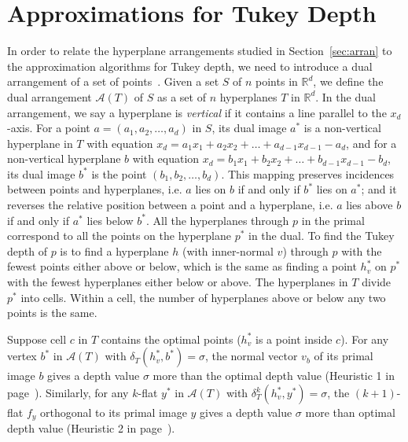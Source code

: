 \documentclass{patmorin}
\begin{document}
\section{Approximations for Tukey Depth}
\label{sec:approx}

In order to relate the hyperplane arrangements studied in Section~\ref{sec:arran} to the approximation algorithms for Tukey depth, we need to introduce a dual arrangement of a set of points~\cite{Edel87}. Given a set $S$ of $n$ points in $\mathbb{R}^{d}$, we define the dual arrangement $\mathcal{A}(T)$ of $S$ as a set of $n$ hyperplanes $T$ in $\mathbb{R}^{d}$. In the dual arrangement, we say a hyperplane is \emph{vertical} if it contains a line parallel to the $x_{d}$-axis. For a point $a = (a_{1}, a_{2}, \ldots, a_{d})$ in $S$, its dual image $a^{*}$ is a non-vertical hyperplane in $T$ with equation $x_{d} = a_{1}x_{1} + a_{2}x_{2} + \ldots + a_{d-1}x_{d-1} - a_{d}$, and for a non-vertical hyperplane $b$ with equation $x_{d} = b_{1}x_{1} + b_{2}x_{2} + \ldots + b_{d-1}x_{d-1} - b_{d}$, its dual image $b^{*}$ is the point $(b_{1}, b_{2}, \ldots, b_{d})$. This mapping preserves incidences between points and hyperplanes, i.e. $a$ lies on $b$ if and only if $b^{*}$ lies on $a^{*}$; and it reverses the relative position between a point and a hyperplane, i.e. $a$ lies above $b$ if and only if $a^{*}$ lies below $b^{*}$. All the hyperplanes through $p$ in the primal correspond to all the points on the hyperplane $p^{*}$ in the dual. To find the Tukey depth of $p$ is to find a hyperplane $h$ (with inner-normal $v$) through $p$ with the fewest points either above or below, which is the same as finding a point $h_{v}^{*}$ on $p^{*}$ with the fewest hyperplanes either below or above. The hyperplanes in $T$ divide $p^{*}$ into cells. Within a cell, the number of hyperplanes above or below any two points is the same.

Suppose cell $c$ in $T$ contains the optimal points ($h_{v}^{*}$ is a point inside $c$). For any vertex $b^{*}$ in $\mathcal{A}(T)$ with $\delta_{T}(h_{v}^{*},b^{*}) = \sigma$, the normal vector $v_{b}$ of its primal image $b$ gives a depth value $\sigma$ more than the optimal depth value (Heuristic 1 in page~\pageref{page:heuristic1}). Similarly, for any $k$-flat $y^{*}$ in $\mathcal{A}(T)$ with $\delta_{T}^{k}(h_{v}^{*},y^{*}) = \sigma$, the $(k+1)$-flat $f_{y}$ orthogonal to its primal image $y$ gives a depth value $\sigma$ more than optimal depth value (Heuristic 2 in page~\pageref{page:heuristic2}). 

\end{document}
